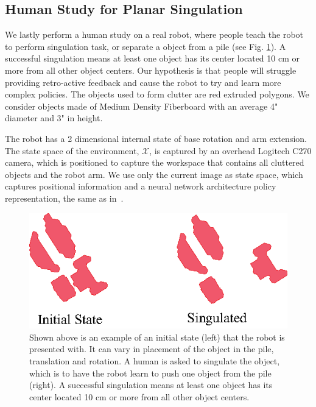 \documentclass[10pt, conference]{ieeeconf}      %
\begin{document}
\subsection{Human Study for Planar Singulation}
We lastly perform a human study on a real robot, where people teach the robot to perform singulation task, or separate a object from a pile (see Fig. \ref{fig:izzy_sing}). A successful singulation means at least one object has its center located 10 cm or more from all other object centers. Our hypothesis is that people will struggle providing retro-active feedback and cause the robot to try and learn more complex policies.  The objects used to form clutter are red extruded polygons. We consider objects made of Medium Density Fiberboard with an average 4" diameter and 3" in height. 

The robot has a 2 dimensional internal state of base rotation and arm extension. The state space of the environment, $\mathcal{X}$, is captured by an overhead Logitech C270 camera, which is positioned to capture the workspace that contains all cluttered objects and the robot arm. We use only the current image as state space, which captures positional information and a neural network architecture policy representation, the same as in~\cite{laskeyrobot}.

\begin{figure}
\centering
\includegraphics{f_figs/singulation.eps}
\caption{
    \footnotesize
Shown above is an example of an initial state (left) that the robot is presented with. It can vary in placement of the object in the pile, translation and rotation. A human is asked to singulate the object, which is to have the robot learn to push one object from the pile (right). A successful singulation means at least one object has its center located 10 cm or more from all other object centers.   }

\label{fig:izzy_sing}
\end{figure}
\end{document}

